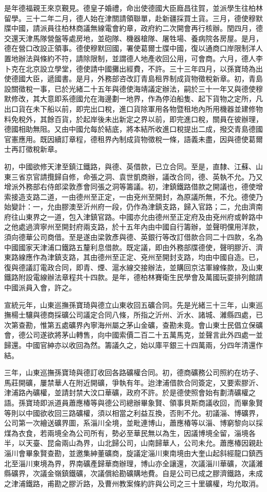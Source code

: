 \begin{pinyinscope}
是年德福親王來京覲見。德皇子婚禮，命出使德國大臣廕昌往賀，並派學生往柏林留學。三十二年二月，德人始在津關請領聯單，赴新疆採買土貨。三月，德使穆默牒中國，請派員往柏林商議無線電會約章，政府約二次開會再行核辦。閏四月，德交還天津馬隊營盤等處房地，並砲隊、機器槍隊、屠牲場、養病院各房屋。是月，德在營口改設正領事。德使穆默回國，署使葛爾士牒中國，復以通商口岸限制洋人置地辦法與條約不符，請除限制，並謂德人地產收回公用，可會商。六月，德人李卜克在北京設立學堂，德使請中國攤出經費，不許。三十三年四月，以孫寶琦為出使德國大臣，遞國書。是月，外務部咨改訂青島租界制成貨物徵稅新章。初，青島設關徵稅一事，已於光緒二十五年與德使海靖議定辦法，嗣於三十一年又與德使穆默修改，其大意即系德國允在海邊劃一地界，作為停泊船隻、起下貨物之定所，凡出口貨在未下船以前，即完出口稅，進口貨除軍用各物暨租地內所用機器並建修物料免稅外，其餘百貨，於起岸後未出新定之界以前，即完進口稅，關員在彼辦理，德國相助無阻。又由中國允每於結底，將本結所收進口稅提出二成，撥交青島德國官憲應用。既因續訂章程，德租界內制成貨物徵稅一條，語義未盡，因與德使葛爾士再訂徵稅新章。

初，中國欲修天津至鎮江鐵路，與德、英借款，已立合同。至是，直隸、江蘇、山東三省京官請攬歸自修，命張之洞、袁世凱商辦，議改合同，德、英執不允。乃又增派外務部右侍郎梁敦彥會同張之洞等籌議。初，津鎮鐵路借款之開議也，德使增索接造支路二道，一由德州至正定，一由兗州至開封，為原議所無，不允。德使乃始變計：一，允由膠澳至沂州府一段，仍作為津鎮支路，歸入官路；二，允由濟南府往山東界之一道，包入津鎮官路。中國亦允由德州至正定府及由兗州府或幹路中之他處過濟寧州至開封府兩支路，於十五年內由中國自行籌辦，並聲明儻用洋款，須向德華公司商借。至是遂由梁敦彥與德、英銀行等改訂借款合同二十四款，名為中國國家天津浦口鐵路五釐利息借款。既定議，即由外務部牒德使，聲明膠沂、濟東路線應作為津鎮支路，其由德州至正定、兗州至開封支路，均由中國自造。已，復與德議訂電政合同，即青、煙、滬水線交接辦法，並購回京沽軍線條款，及山東鐵路附設電線辦法章程共十四款。是年，德柏林賽衛生民學會及萬國玩耍排列館請中國派員入會，許之。

宣統元年，山東巡撫孫寶琦與德立山東收回五礦合同。先是光緒三十三年，山東巡撫楊士驤與德商採礦公司議定合同八條，所指之沂州、沂水、諸城、濰縣四處，已次第查勘，惟第五處礦界內寧海州屬之茅山金礦，查勘未竟。會山東士民倡立保礦會，德公司遂欲將茅山轉售，向中國索價二百二十五萬馬克，並聲言此外四處一並歸還。中國官紳亦以收回為然。籌議久之，始以庫平銀三十四萬兩，分四年清還作結。

三年，山東巡撫孫寶琦與德訂收回各路礦權合同。初，德商礦務公司照約在坊子、馬莊開礦，屢禁華人在附近開礦，爭執有年。迨津浦借款合同簽定，又要索膠沂、津浦路內礦權，並請封禁大汶口華礦，政府不許。於是德使照會始有劃清礦權之語。孫寶琦即派道員蕭應椿等與德公司總辦畢象賢、領事貝斯商議收回，而畢象賢等則以中國欲收回三路礦權，須以相當之利益互換，否則不允。初議淄、博礦界，公司第一次繪送礦界圖，系淄川全境，並毗連博山，蕭應椿等以淄、博窮黎向以採煤為衣食，若兩境全為公司所有，勢必至華民無以為生，因議博境全留，淄境各半，以天臺、昆侖兩山為界，山北歸公司，山南歸華人，公司未允。蕭應椿因親赴淄川會畢象賢查勘，並邀集紳董礦商，旋議定淄川東南境由大奎山起斜經龍口鎮西北至淄川東境為界，界南礦產歸華商辦理，博山亦全讓還，次議淄川華礦，次議濰縣礦界，次議金嶺鎮鐵礦，次議償給勘礦購地費。自是公司已成之膠濟鐵路，未成之津浦鐵路，甫勘之膠沂路，及曹州教案條約許與公司之三十里礦權，均允取消。


\end{pinyinscope}